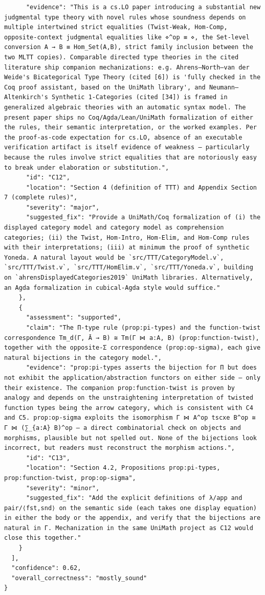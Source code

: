 \documentclass[11pt]{article}
\begin{document}
\begin{verbatim}
      "evidence": "This is a cs.LO paper introducing a substantial new judgmental type theory with novel rules whose soundness depends on multiple intertwined strict equalities (Twist-Weak, Hom-Comp, opposite-context judgmental equalities like ⋄^op ≡ ⋄, the Set-level conversion A → B ≡ Hom_Set(A,B), strict family inclusion between the two MLTT copies). Comparable directed type theories in the cited literature ship companion mechanizations: e.g. Ahrens–North–van der Weide's Bicategorical Type Theory (cited [6]) is 'fully checked in the Coq proof assistant, based on the UniMath library', and Neumann–Altenkirch's Synthetic 1-Categories (cited [34]) is framed in generalized algebraic theories with an automatic syntax model. The present paper ships no Coq/Agda/Lean/UniMath formalization of either the rules, their semantic interpretation, or the worked examples. Per the proof-as-code expectation for cs.LO, absence of an executable verification artifact is itself evidence of weakness — particularly because the rules involve strict equalities that are notoriously easy to break under elaboration or substitution.",
      "id": "C12",
      "location": "Section 4 (definition of TTT) and Appendix Section 7 (complete rules)",
      "severity": "major",
      "suggested_fix": "Provide a UniMath/Coq formalization of (i) the displayed category model and category model as comprehension categories; (ii) the Twist, Hom-Intro, Hom-Elim, and Hom-Comp rules with their interpretations; (iii) at minimum the proof of synthetic Yoneda. A natural layout would be `src/TTT/CategoryModel.v`, `src/TTT/Twist.v`, `src/TTT/HomElim.v`, `src/TTT/Yoneda.v`, building on `ahrensDisplayedCategories2019` UniMath libraries. Alternatively, an Agda formalization in cubical-Agda style would suffice."
    },
    {
      "assessment": "supported",
      "claim": "The Π-type rule (prop:pi-types) and the function-twist correspondence Tm_d(Γ, Ā → B) ≅ Tm(Γ ⋈ a:A, B) (prop:function-twist), together with the opposite-Σ correspondence (prop:op-sigma), each give natural bijections in the category model.",
      "evidence": "prop:pi-types asserts the bijection for Π but does not exhibit the application/abstraction functors on either side — only their existence. The companion prop:function-twist is proven by analogy and depends on the unstraightening interpretation of twisted function types being the arrow category, which is consistent with C4 and C5. prop:op-sigma exploits the isomorphism Γ ⋈ A^op tscxe B^op ≅ Γ ⋈ (∑_{a:A} B)^op — a direct combinatorial check on objects and morphisms, plausible but not spelled out. None of the bijections look incorrect, but readers must reconstruct the morphism actions.",
      "id": "C13",
      "location": "Section 4.2, Propositions prop:pi-types, prop:function-twist, prop:op-sigma",
      "severity": "minor",
      "suggested_fix": "Add the explicit definitions of λ/app and pair/⟨fst,snd⟩ on the semantic side (each takes one display equation) in either the body or the appendix, and verify that the bijections are natural in Γ. Mechanization in the same UniMath project as C12 would close this together."
    }
  ],
  "confidence": 0.62,
  "overall_correctness": "mostly_sound"
}
\end{verbatim}
\end{document}
